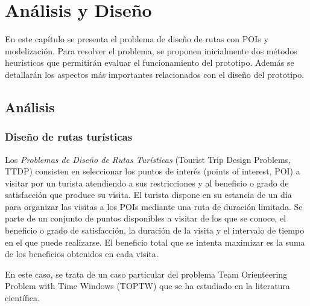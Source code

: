 \chapter{Análisis y Diseño}
En este capítulo se presenta el problema de diseño de rutas con POIs y modelización. Para resolver el problema, se proponen inicialmente dos métodos heurísticos que permitirán evaluar el funcionamiento del prototipo. Además se detallarán los aspectos más importantes relacionados con el diseño del prototipo.
\section[Análisis]{Análisis}
\subsection[Diseño de rutas turísticas]{Diseño de rutas turísticas}
Los \textit{Problemas de Diseño de Rutas Turísticas} (Tourist Trip Design Problems, TTDP) consisten en seleccionar los puntos de interés (points of interest, POI) a visitar por un turista atendiendo a sus restricciones y al beneficio o grado de satisfacción que produce su visita. El turista dispone en su estancia de un día para organizar las visitas a los POIs mediante una ruta de duración limitada. Se parte de un conjunto de puntos disponibles a visitar de los que se conoce, el beneficio o grado de satisfacción, la duración de la visita y el intervalo de tiempo en el que puede realizarse. El beneficio total que se intenta maximizar es la suma de los beneficios obtenidos en cada visita.\newline

En este caso, se trata de un caso particular del problema Team Orienteering Problem with Time Windows (TOPTW) que se ha estudiado en la literatura científica.\newline

